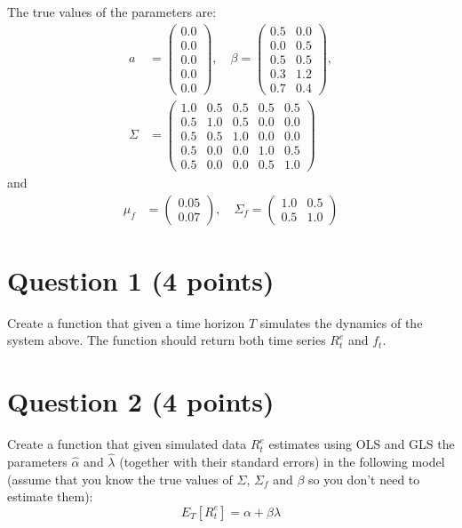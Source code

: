 \documentclass[a4paper,12pt]{article}
\begin{document}
	The true values of the parameters are:
	\begin{align*}
		a &= \begin{pmatrix} 0.0 \\ 0.0 \\ 0.0 \\ 0.0 \\ 0.0 \end{pmatrix}, \quad 
		\beta = \begin{pmatrix} 0.5 & 0.0 \\ 0.0 & 0.5 \\ 0.5 & 0.5 \\ 0.3 & 1.2 \\ 0.7 & 0.4 \end{pmatrix}, \\
		\Sigma &= \begin{pmatrix} 1.0 & 0.5 & 0.5 & 0.5 & 0.5 \\ 0.5 & 1.0 & 0.5 & 0.0 & 0.0 \\ 0.5 & 0.5 & 1.0 & 0.0 & 0.0 \\ 0.5 & 0.0 & 0.0 & 1.0 & 0.5 \\ 0.5 & 0.0 & 0.0 & 0.5 & 1.0 \end{pmatrix}
	\end{align*}
	and
	\begin{align*}
		\mu_f &= \begin{pmatrix} 0.05 \\ 0.07 \end{pmatrix}, \quad 
		\Sigma_f = \begin{pmatrix} 1.0 & 0.5 \\ 0.5 & 1.0 \end{pmatrix}
	\end{align*}
	
	\section*{Question 1 (4 points)}
	Create a function that given a time horizon $T$ simulates the dynamics of the system above. The function should return both time series $R_t^e$ and $f_t$.
	
	\newpage
	\section*{Question 2 (4 points)}
	Create a function that given simulated data $R_t^e$ estimates using OLS and GLS the parameters $\hat{\alpha}$ and $\hat{\lambda}$ (together with their standard errors) in the following model (assume that you know the true values of $\Sigma$, $\Sigma_f$ and $\beta$ so you don't need to estimate them):
	\begin{equation*}
		E_T[R_{t}^e] = \alpha + \beta \lambda
	\end{equation*}
	
\end{document}
